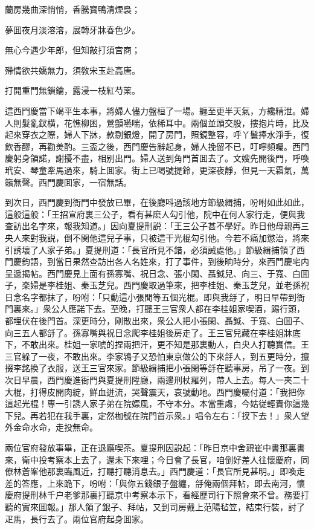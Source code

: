 \begin{myquote}
蘭房幾曲深悄悄，香騰寳鴨清煙裊；

夢囬夜月淡溶溶，展轉牙牀春色少。

無心今遇少年郎，但知敲打須宫商；

殢情欲共嬌無力，須敎宋玉赴高唐。

打開重門無鎖鑰，露浸一枝紅芍薬。
\end{myquote}

這西門慶當下竭平生本事，將婦人儘力盤桓了一場。纏至更半天氣，方纔精泄。婦人則髮亂釵横，花憔柳困，鶯顫嚥喘，依稀耳中。兩個並頭交股，摟抱片時，比及起來穿衣之際，婦人下牀，款剔銀燈，開了房門，照鏡整容，呼丫鬟捧水淨手，復飲香醪，再勸羙酌。三盃之後，西門慶告辭起身，婦人挽留不已，叮嚀頻囑。西門慶躬身領諾，謝擾不盡，相别出門。婦人送到角門首囬去了。文嫂先開後門，呼喚玳安、琴童牽馬過來，騎上囬家。街上已喝號提鈴，更深夜靜，但見一天霜氣，萬籟無聲。西門慶囬家，一宿無話。

到次日，西門慶到衙門中發放已畢，在後廳呌過該地方節級緝捕，吩咐如此如此，這般這般：「王招宣府裏三公子，看有甚麽人勾引他，院中在何人家行走，便與我查訪出名字來，報我知道。」因向夏提刑説：「王三公子甚不學好。昨日他母親再三央人來對我説，倒不関他這兒子事，只被這干光棍勾引他。今若不痛加懲治，將來引誘壞了人家子弟。」夏提刑道：「長官所見不錯，必須誡處他。」節級緝捕領了西門慶鈞語，到當日果然查訪出各人名姓來，打了事件，到後晌時分，來西門慶宅内呈遞揭帖。西門慶見上面有孫寡嘴、祝日念、張小閑、聶鉞兒、向三、于寬、白囬子，楽婦是李桂姐、秦玉芝兒。西門慶取過筆來，把李桂姐、秦玉芝兒，並老孫祝日念名字都抹了，吩咐：「只動這小張閒等五個光棍。即與我㧱了，明日早帶到衙門裏來。」衆公人應諾下去。至晚，打聽王三官衆人都在李桂姐家喫酒，踢行頭，都埋伏在後門首。深更時分，剛散出來，衆公人把小張閑、聶鉞、于寬、白囬子、向三五人都㧱了。孫寡嘴與祝日念爬李桂姐後房走了。王三官兒藏在李桂姐牀底下，不敢出來。桂姐一家唬的捏兩把汗，更不知是那裏動人，白央人打聽實信。王三官躲了一夜，不敢出來。李家鴇子又恐怕東京做公的下來㧱人，到五更時分，攛掇李銘換了衣服，送王三官來家。節級緝捕把小張閑等㧱在聽事房，吊了一夜。到次日早晨，西門慶進衙門與夏提刑陞廳，兩邊刑杖羅列，帶人上去。每人一夾二十大棍，打得皮開肉綻，鮮血迸流，哭聲震天，哀號動地。西門慶囑付道：「我把你這起光棍！專一引誘人家子弟在院嫖風，不守本分。本當重䖏，今姑従輕責你這幾下兒。再若犯在我手裏，定然枷號在院門首示衆。」唱令左右：「扠下去！」衆人望外金命水命，走投無命。

兩位官府發放事畢，正在退廳喫茶。夏提刑因説起：「昨日京中舍親崔中書那裏書來，衛中投考察本上去了，還未下來哩；今日會了長官，咱倒好差人往懷慶府，同僚林蒼峯他那裏臨風近，打聽打聽消息去。」西門慶道：「長官所見甚明。」即喚走差的答應，上來跪下，吩咐：「與你五錢銀子盤纏，㧱俺兩個拜帖，即去南河，懷慶府提刑林千户老爹那裏打聽京中考察本示下，看經歷司行下照會來不曾。務要打聽的實來囬報。」那人領了銀子、拜帖，又到司房戴上范陽毡笠，結束行裝，討了疋馬，長行去了。兩位官府起身囬家。

